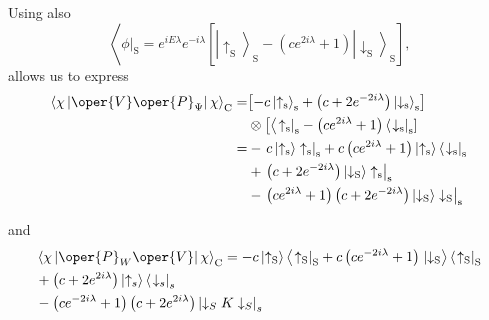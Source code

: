 Using also
\begin{equation}
\left\langle\left.\phi\right|_{\mathrm{S}}=e^{i E \lambda} e^{-i \lambda}\left[\left|\uparrow_{\mathrm{S}}\right\rangle_{\mathrm{S}}-\left(c e^{2 i \lambda}+1\right)\left|\downarrow_{\mathrm{S}}\right\rangle_{\mathrm{S}}\right],\right.
\end{equation}
allows us to express
\begin{equation}
\begin{aligned}
\left\langle\chi\left|\oper{V} \oper{P}_{\Psi}\right| \chi\right\rangle_{\mathrm{C}}= & {\left[-c\left|\uparrow_{\mathrm{s}}\right\rangle_{\mathrm{s}}+\left(c+2 e^{-2 i \lambda}\right)\left|\downarrow_{\mathrm{s}}\right\rangle_{\mathrm{s}}\right] } \\
& \otimes\left[\left\langle\left.\uparrow_{\mathrm{s}}\right|_{\mathrm{s}}-\left(c e^{2 i \lambda}+1\right)\left\langle\left.\downarrow_{\mathrm{s}}\right|_{\mathrm{s}}\right]\right.\right. \\
= & -\left.c\left|\uparrow_{\mathrm{s}}\right\rangle \uparrow_{\mathrm{s}}\right|_{\mathrm{s}}+c\left(c e^{2 i \lambda}+1\right)\left|\uparrow_{\mathrm{s}}\right\rangle\left\langle\left.\downarrow_{\mathrm{s}}\right|_{\mathrm{s}}\right. \\
& +\left.\left(c+2 e^{-2 i \lambda}\right)\left|\downarrow_{\mathrm{S}}\right\rangle \uparrow_{\mathrm{s}}\right|_{\mathrm{s}} \\
& -\left.\left(c e^{2 i \lambda}+1\right)\left(c+2 e^{-2 i \lambda}\right)\left|\downarrow_{\mathrm{S}}\right\rangle \downarrow_{\mathrm{S}}\right|_{\mathrm{s}}
\end{aligned}
\end{equation}

and
\begin{equation}
\begin{aligned}
& \left\langle\chi\left|\oper{P}_W \oper{V}\right| \chi\right\rangle_{\mathrm{C}}=-c\left|\uparrow_{\mathrm{S}}\right\rangle\left\langle\left.\uparrow_{\mathrm{S}}\right|_{\mathrm{S}}+c\left(c e^{-2 i \lambda}+1\right) \mid \downarrow_{\mathrm{S}}\right\rangle\left\langle\left.\uparrow_{\mathrm{S}}\right|_{\mathrm{S}}\right. \\
& +\left(c+2 e^{2 i \lambda}\right)\left|\uparrow_s\right\rangle\left\langle\left.\downarrow_s\right|_s\right. \\
& -\left(c e^{-2 i \lambda}+1\right)\left(c+2 e^{2 i \lambda}\right)\left|\downarrow_S K \downarrow_S\right|_s \\
&
\end{aligned}
\end{equation}

